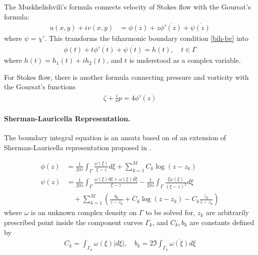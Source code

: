 \documentclass[10pt,twocolumn]{article}
\begin{document}
The Muskhelishvili's formula connects velocity of Stokes flow with the Goursat's formula: 
\begin{align}
    u(x,y) + iv(x,y) 
    &= \phi(z) + z \overline{\phi'(z)} + \overline{\psi(z)}
    \label{muskhelishvili}
\end{align} where $\psi = \chi'$. This transforms the biharmonic boundary condition \eqref{bih-bv} into 
\begin{align}
  \phi(t) + t\overline{\phi'(t)} + \overline{\psi(t)} 
  = h(t), \quad
  t \in \Gamma
\end{align} where $h(t) =  h_1(t) + ih_2(t)$,  and $t$ is understood as a complex variable. 

For Stokes flow, there is another formula connecting pressure and vorticity with 
the Goursat's functions
\begin{align}
  \zeta + \frac{i}{\nu}p = 4\phi'(z) \label{pressure-and-vorticity}
\end{align}


\paragraph*{Sherman-Lauricella Representation.} The boundary integral equation is an ansatz 
based on of an extension of Sherman-Lauricella representation 
proposed in \cite{greengardIntegralEquationMethods1996}.

\begin{align}
  \phi(z) &=
    \frac {1}{2\pi i} \int_\Gamma \frac{\omega(\xi)}{\xi - z} d\xi  
    + \sum_{k=1}^M C_k \log (z-z_k)
    \\
  \psi(z) &=
    \frac {1}{2\pi i} \int_\Gamma \frac{\overline{\omega(\xi)}d\xi +  \omega(\xi)\overline{d\xi}}{\xi - z}  
    - \frac {1}{2\pi i} \int_\Gamma \frac{\overline{\xi} \omega(\xi)}{(\xi - z)^2} d\xi  
    \\
    & \quad + \sum _{k=1}^M 
    \left( \frac{b_k}{z-z_k} + \overline C_k \log (z-z_k) -  C_k \frac{\overline z_k}{z-z_k} \right) \nonumber 
\end{align}
where $\omega$ is an unknown complex density on $\Gamma$ to be solved for, 
$z_k$ are arbitrarily prescribed point inside the component curves $\Gamma_k$, 
and $C_k, b_k$ are constants defined by 
\begin{align}
  C_k = \int_{\Gamma_k} \omega(\xi) |d\xi|, \quad b_k = 2 \Im\int_{\Gamma_k} \overline{\omega(\xi)} {d\xi}
\end{align}
\end{document}
